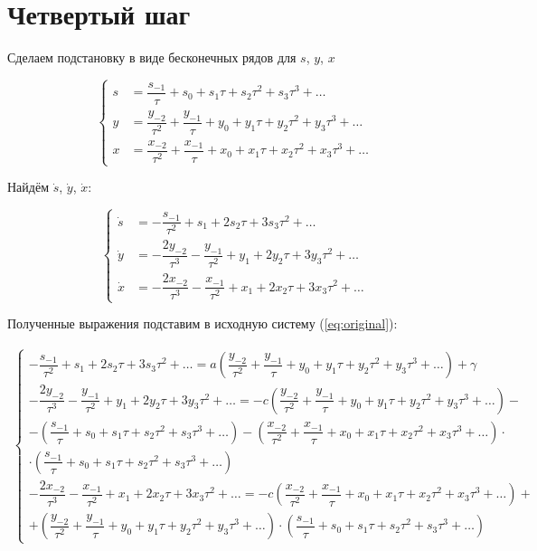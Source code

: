 \section{Четвертый шаг}

Сделаем подстановку в виде бесконечных рядов для $ s $, $ y $, $ x $ 

$$
	\left\{
		\begin{aligned}
			s &= \dfrac{s_{-1}}{\tau} + s_0 + s_1\tau + s_2\tau^2 + s_3\tau^3 + \ldots \\
			y &= \dfrac{y_{-2}}{\tau^2} + \dfrac{y_{-1}}{\tau} + y_0 + y_1\tau + y_2\tau^2 + y_3\tau^3 + \ldots \\
			x &= \dfrac{x_{-2}}{\tau^2} + \dfrac{x_{-1}}{\tau} + x_0 + x_1\tau + x_2\tau^2 + x_3\tau^3 + \ldots
		\end{aligned}
	\right.
$$

Найдём $ \dot s $, $ \dot y $, $ \dot x $:

$$
	\left\{
		\begin{aligned}
			\dot s &= -\dfrac{s_{-1}}{\tau^{2}} + s_1 + 2s_2\tau + 3s_3\tau^2 + \ldots \\
			\dot y &= -\dfrac{2y_{-2}}{\tau^{3}} - \dfrac{y_{-1}}{\tau^2} + y_1 + 2y_2\tau + 3y_3\tau^2 + \ldots \\
			\dot x &= -\dfrac{2x_{-2}}{\tau^{3}} - \dfrac{x_{-1}}{\tau^2} + x_1 + 2x_2\tau + 3x_3\tau^2 + \ldots
		\end{aligned}
	\right.
$$

\newpage

Полученные выражения подставим в исходную систему (\ref{eq:original}):

\begin{eqnarray*}
	\left\{
		\begin{aligned}
			-\dfrac{s_{-1}}{\tau^{2}} + s_1 + 2s_2\tau + 3s_3\tau^2 + \ldots = a \left( \dfrac{y_{-2}}{\tau^2} + \dfrac{y_{-1}}{\tau} + y_0 + y_1\tau + y_2\tau^2 + y_3\tau^3 + \ldots \right) + \gamma \\			
			-\dfrac{2y_{-2}}{\tau^{3}} - \dfrac{y_{-1}}{\tau^2} + y_1 + 2y_2\tau + 3y_3\tau^2 + \ldots = -c \left( \dfrac{y_{-2}}{\tau^2} + \dfrac{y_{-1}}{\tau} + y_0 + y_1\tau + y_2\tau^2 + y_3\tau^3 + \ldots \right) - \\ - \left( \dfrac{s_{-1}}{\tau} + s_0 + s_1\tau + s_2\tau^2 + s_3\tau^3 + \ldots \right) - \left( \dfrac{x_{-2}}{\tau^2} + \dfrac{x_{-1}}{\tau} + x_0 + x_1\tau + x_2\tau^2 + x_3\tau^3 + \ldots \right) \cdot \\ \cdot \left( \dfrac{s_{-1}}{\tau} + s_0 + s_1\tau + s_2\tau^2 + s_3\tau^3 + \ldots \right) \\	
			-\dfrac{2x_{-2}}{\tau^{3}} - \dfrac{x_{-1}}{\tau^2} + x_1 + 2x_2\tau + 3x_3\tau^2 + \ldots = -c \left( \dfrac{x_{-2}}{\tau^2} + \dfrac{x_{-1}}{\tau} + x_0 + x_1\tau + x_2\tau^2 + x_3\tau^3 + \ldots \right) + \\ + \left( \dfrac{y_{-2}}{\tau^2} + \dfrac{y_{-1}}{\tau} + y_0 + y_1\tau + y_2\tau^2 + y_3\tau^3 + \ldots \right) \cdot \left( \dfrac{s_{-1}}{\tau} + s_0 + s_1\tau + s_2\tau^2 + s_3\tau^3 + \ldots \right)
		\end{aligned}
	\right.
\end{eqnarray*}

